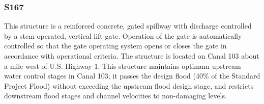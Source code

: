 
%
%



\clearpage
\subsubsection{S167}

This structure is a reinforced concrete, gated spillway with discharge controlled by a stem operated, vertical lift gate. Operation of the gate is automatically controlled so that the gate operating system opens or closes the gate in accordance with operational criteria. The structure is located on Canal 103 about a mile west of U.S. Highway 1. This structure maintains optimum upstream water control stages in Canal 103; it passes the design flood (40\% of the Standard Project Flood) without exceeding the upstream flood design stage, and restricts downstream flood stages and channel velocities to non-damaging levels.


